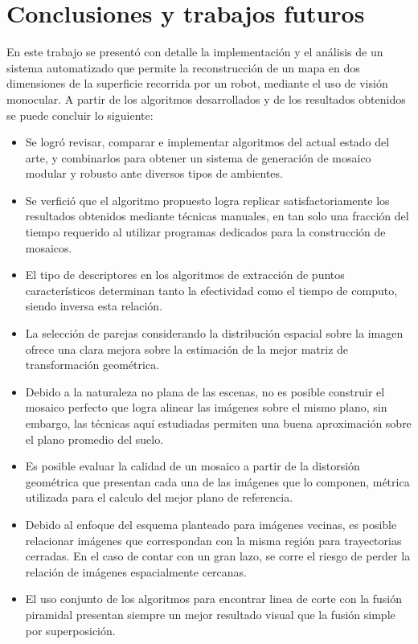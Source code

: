 \chapter{Conclusiones y trabajos futuros}
\label{capitulo6}

En este trabajo se presentó con detalle la implementación y el análisis de un sistema automatizado que permite la reconstrucción de un mapa en dos dimensiones de la superficie recorrida por un robot, mediante el uso de visión monocular. A partir de los algoritmos desarrollados y de los resultados obtenidos se puede concluir lo siguiente:

\begin{itemize}
	\item Se logró revisar, comparar e implementar algoritmos del actual estado del arte, y combinarlos para obtener un sistema de generación de mosaico modular y robusto ante diversos tipos de ambientes.
	
	\item Se verfició que el algoritmo propuesto logra replicar satisfactoriamente los resultados obtenidos mediante técnicas manuales, en tan solo una fracción del tiempo requerido al utilizar programas dedicados para la construcción de mosaicos. 
	
	\item El tipo de descriptores en los algoritmos de extracción de puntos característicos determinan tanto la efectividad como el tiempo de computo, siendo inversa esta relación.
	
	\item La selección de parejas considerando la distribución espacial sobre la imagen ofrece una clara mejora sobre la estimación de la mejor matriz de transformación geométrica.
	
	\item Debido a la naturaleza no plana de las escenas, no es posible construir el mosaico perfecto que logra alinear las imágenes sobre el mismo plano, sin embargo, las técnicas aquí estudiadas permiten una buena aproximación sobre el plano promedio del suelo.
	
	\item Es posible evaluar la calidad de un mosaico a partir de la distorsión geométrica que presentan cada una de las imágenes que lo componen, métrica utilizada para el calculo del mejor plano de referencia.
	
	\item Debido al enfoque del esquema planteado para imágenes vecinas, es posible relacionar imágenes que correspondan con la misma región para trayectorias cerradas. En el caso de contar con un gran lazo, se corre el riesgo de perder la relación de imágenes espacialmente cercanas.
	
	\item El uso conjunto de los algoritmos para encontrar linea de corte con la fusión piramidal presentan siempre un mejor resultado visual que la fusión simple por superposición.
		
\end{itemize}

